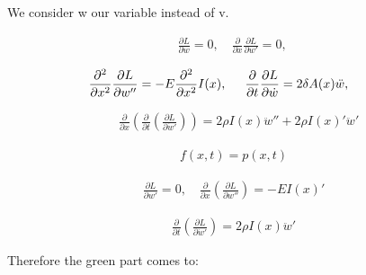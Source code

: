 We consider w our variable instead of v.

\begin{equation}
    \begin{split}
        &\frac{\partial L}{\partial w} = 0, \quad \frac{\partial}{\partial x}\frac{\partial L}{\partial w'} = 0, \quad    
    \end{split}
\end{equation}

\begin{equation}
    \begin{split}
        &\frac{\partial^2}{\partial x^2}\frac{\partial L}{\partial w''} = -E\frac{\partial^2}{\partial x^2}I(x), \hspace{0.5cm} \frac{\partial}{\partial t}\frac{\partial L}{\partial \dot w} = 2\delta A(x)\ddot w, \hspace{0.5cm}
    \end{split}
\end{equation}

\begin{equation}
    \begin{split}
        &\frac{\partial}{\partial x}\left(\frac{\partial}{\partial t}\left(\frac{\partial L}{\partial \dot w'}\right)\right) = 2\rho I(x) \ddot w'' + 2\rho I(x)' \ddot w'
    \end{split}
\end{equation}

\begin{equation}
    \begin{split}
        f(x,t) = p(x,t)
    \end{split}
\end{equation}

\begin{equation}
    \begin{split}
        \frac{\partial L }{\partial w'}= 0, \quad \frac{\partial}{\partial x}(\frac{\partial L}{\partial  w''}) = -EI(x)'
    \end{split}
\end{equation}

\begin{equation}
    \begin{split}
        \frac{\partial}{\partial t}(\frac{\partial L}{\partial \dot w'})= 2\rho I(x) \ddot w' 
    \end{split}
\end{equation}

Therefore the green part comes to:

